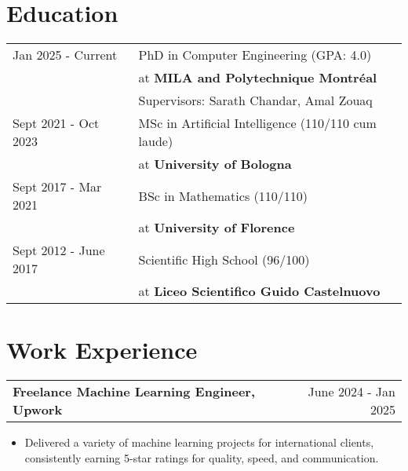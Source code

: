 \documentclass[a4paper,12pt]{article}
\makeatletter
\newenvironment{joblong}[2]
    {
    \begin{tabularx}{\linewidth}{@{}l X r@{}}
    \textbf{#1} & \hfill &  #2 \\[3.75pt]
    \end{tabularx}
    \begin{minipage}[t]{\linewidth}
    \begin{itemize}[nosep,after=\strut, leftmargin=1em, itemsep=3pt,label=--]
    }
    {
    \end{itemize}
    \end{minipage}    
    }
\makeatother
\begin{document}
\section{Education}
\begin{tabularx}{\linewidth}{@{}l X@{}} 	
Jan 2025 - Current & PhD in Computer Engineering \hfill \normalsize (GPA: 4.0) \\
& \normalsize at \textbf{MILA and Polytechnique Montréal} \\
 & \normalsize Supervisors: Sarath Chandar, Amal Zouaq \\

Sept 2021 - Oct 2023 & MSc in Artificial Intelligence \hfill \normalsize (110/110 cum laude) \\
& \normalsize at \textbf{University of Bologna} \\

Sept 2017 - Mar 2021 & BSc in Mathematics \hfill \normalsize (110/110) \\
& \normalsize at \textbf{University of Florence} \\

Sept 2012 - June 2017 & Scientific High School \hfill \normalsize (96/100) \\
& \normalsize at \textbf{Liceo Scientifico Guido Castelnuovo} \\
\end{tabularx}
 


\section{Work Experience}

\begin{joblong}{Freelance Machine Learning Engineer, Upwork}{June 2024 - Jan 2025}
\item Delivered a variety of machine learning projects for international clients, consistently earning 5-star ratings for quality, speed, and communication.
\end{joblong}
\end{document}
